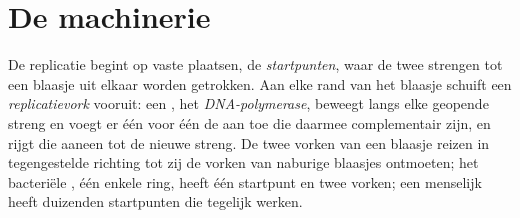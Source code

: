 \section{De machinerie}

\begin{proposition}[Replicatievorken]\label{prop:g11:dna-replication:forks}
De replicatie begint op vaste plaatsen, de \emph{startpunten}, waar de
twee strengen tot een blaasje uit elkaar worden getrokken. Aan elke rand
van het blaasje schuift een
\emph{replicatievork} vooruit: een , het
\emph{DNA-polymerase}, beweegt langs elke geopende
streng en voegt er één voor één de  aan toe die daarmee
complementair zijn, en rijgt die aaneen tot de nieuwe streng. De twee
vorken van een blaasje reizen in tegengestelde richting tot zij de vorken
van naburige blaasjes ontmoeten; het bacteriële , één enkele
ring, heeft één startpunt en twee vorken; een menselijk  heeft
duizenden startpunten die tegelijk werken.
\end{proposition}
\admitted

